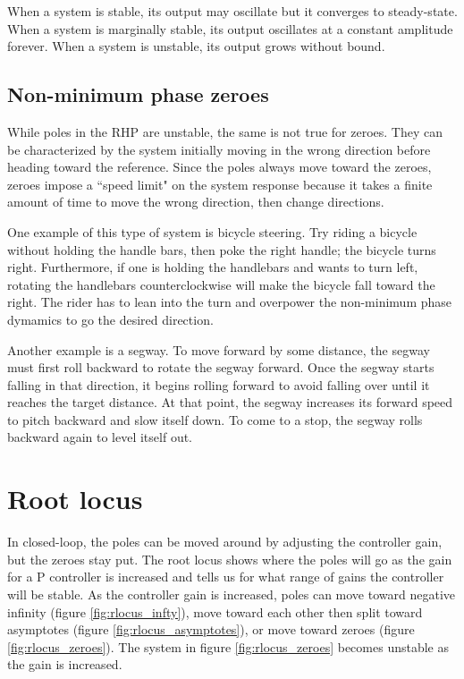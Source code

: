 When a system is stable, its output may oscillate but it converges to
steady-state. When a system is marginally stable, its output oscillates at a
constant amplitude forever. When a system is unstable, its output grows without
bound.

\subsection{Non-minimum phase zeroes}

While poles in the RHP are unstable, the same is not true for zeroes. They can
be characterized by the \gls{system} initially moving in the wrong direction
before heading toward the \gls{reference}. Since the poles always move toward
the zeroes, zeroes impose a ``speed limit" on the \gls{system} response because
it takes a finite amount of time to move the wrong direction, then change
directions.

One example of this type of system is bicycle steering. Try riding a bicycle
without holding the handle bars, then poke the right handle; the bicycle turns
right. Furthermore, if one is holding the handlebars and wants to turn left,
rotating the handlebars counterclockwise will make the bicycle fall toward the
right. The rider has to lean into the turn and overpower the non-minimum phase
dymamics to go the desired direction.

Another example is a segway. To move forward by some distance, the segway must
first roll backward to rotate the segway forward. Once the segway starts falling
in that direction, it begins rolling forward to avoid falling over until
it reaches the target distance. At that point, the segway increases its forward
speed to pitch backward and slow itself down. To come to a stop, the segway
rolls backward again to level itself out.

\section{Root locus}

In closed-loop, the poles can be moved around by adjusting the controller gain,
but the zeroes stay put. The root locus shows where the poles will go as the
gain for a P controller is increased and tells us for what range of gains the
controller will be stable. As the controller gain is increased, poles can move
toward negative infinity (figure \ref{fig:rlocus_infty}), move toward each other
then split toward asymptotes (figure \ref{fig:rlocus_asymptotes}), or move
toward zeroes (figure \ref{fig:rlocus_zeroes}). The \gls{system} in figure
\ref{fig:rlocus_zeroes} becomes unstable as the gain is increased.

